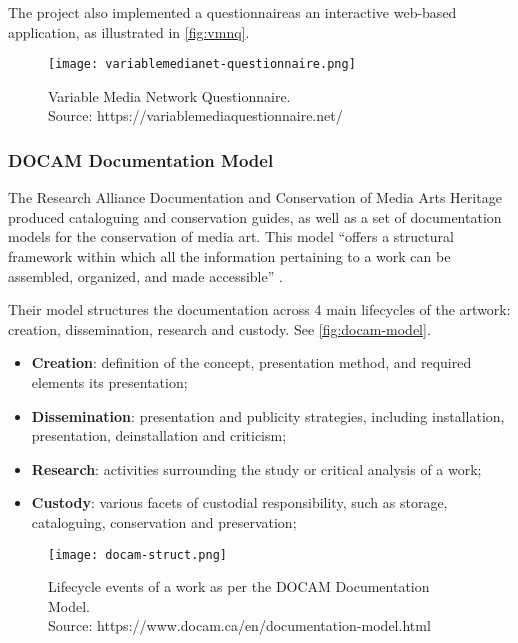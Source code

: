 The project also implemented a questionnaire\footnotemark[8] as an interactive web-based application, as illustrated in \autoref{fig:vmnq}.


\begin{figure}[h]
    \centering
    \captionsetup{justification=centering}
    \texttt{[image: variablemedianet-questionnaire.png]}
    \captionsetup{justification=centering}
    \caption[Variable Media Network Questionnaire]{Variable Media Network Questionnaire. \\ Source: https://variablemediaquestionnaire.net/}
    \label{fig:vmnq}
\end{figure}

\subsubsection{DOCAM Documentation Model}

The Research Alliance Documentation and Conservation of Media Arts Heritage \cite{DOCAM} produced cataloguing and conservation guides, as well as a set of documentation models for the conservation of media art. This model ``offers a structural framework within which all the information pertaining to a work can be assembled, organized, and made accessible'' \cite[p.151]{depocasDocumentingConservingTechnological2013}.

Their model structures the documentation across 4 main lifecycles of the artwork: creation, dissemination, research and custody. See \autoref{fig:docam-model}.

\begin{itemize}
    \item \textbf{Creation}: definition of the concept, presentation method, and required elements its presentation;
    \item \textbf{Dissemination}: presentation and publicity strategies, including installation, presentation, deinstallation and criticism;
    \item \textbf{Research}: activities surrounding the study or critical analysis of a work;
    \item \textbf{Custody}:  various facets of custodial responsibility, such as storage, cataloguing, conservation and preservation;
\end{itemize}


\begin{figure}[h]
    \centering
    \captionsetup{justification=centering}
    \texttt{[image: docam-struct.png]}
    \captionsetup{justification=centering}
    \caption[DOCAM Documentation Model - Lifecycle Events]{Lifecycle events of a work as per the DOCAM Documentation Model. \\ Source: https://www.docam.ca/en/documentation-model.html}
    \label{fig:docam-model}
\end{figure}


